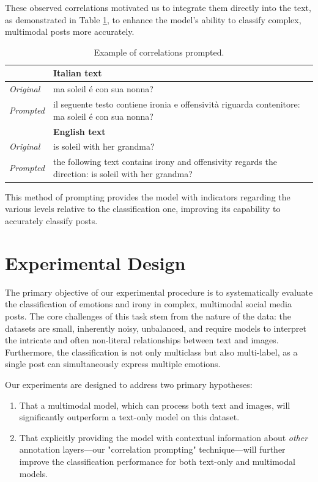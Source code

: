 \documentclass[letterpaper,journal]{IEEEtran}
\begin{document}
These observed correlations motivated us to integrate them directly into the text, as demonstrated in Table \ref{table:prompting}, to enhance the model's ability to classify complex, multimodal posts more accurately.

\begin{table}[htb!]
\begin{center}
{\footnotesize
\begin{tabular}{l|l}
\hline
& \textbf{Italian text} \\
\hline
\textit{Original} & ma soleil é con sua nonna? \\
\textit{Prompted} & il seguente testo contiene ironia e offensività riguarda contenitore: ma soleil é con sua nonna? \\
\hline
& \textbf{English text} \\
\hline
\textit{Original} & is soleil with her grandma? \\
\textit{Prompted} & the following text contains irony and offensivity regards the direction: is soleil with her grandma? \\
\hline
\end{tabular}
}
\end{center}
\setlength{\belowcaptionskip}{-0.1cm}
\caption{Example of correlations prompted.}
\label{table:prompting}
\end{table}

This method of prompting provides the model with indicators regarding the various levels relative to the classification one, improving its capability to accurately classify posts.


\section{Experimental Design}
The primary objective of our experimental procedure is to systematically evaluate the classification of emotions and irony in complex, multimodal social media posts. The core challenges of this task stem from the nature of the data: the datasets are small, inherently noisy, unbalanced, and require models to interpret the intricate and often non-literal relationships between text and images. Furthermore, the classification is not only multiclass but also multi-label, as a single post can simultaneously express multiple emotions.

Our experiments are designed to address two primary hypotheses:
\begin{enumerate}
    \item That a multimodal model, which can process both text and images, will significantly outperform a text-only model on this dataset.
    \item That explicitly providing the model with contextual information about \textit{other} annotation layers—our "correlation prompting" technique—will further improve the classification performance for both text-only and multimodal models.
\end{enumerate}
\end{document}
